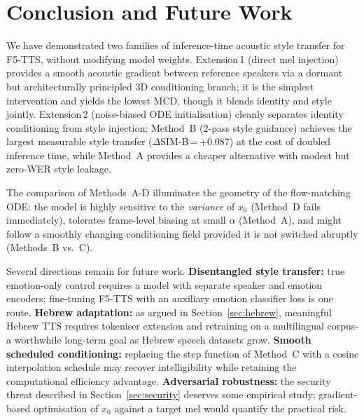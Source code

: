 \documentclass[11pt,a4paper,twocolumn]{article}
\begin{document}
\section{Conclusion and Future Work}
\label{sec:conclusion}

We have demonstrated two families of inference-time acoustic style transfer
for F5-TTS, without modifying model weights.
Extension\,1 (direct mel injection) provides a smooth acoustic gradient
between reference speakers via a dormant but architecturally principled 3D
conditioning branch; it is the simplest intervention and yields the lowest
MCD, though it blends identity and style jointly.
Extension\,2 (noise-biased ODE initialisation) cleanly separates identity
conditioning from style injection; Method~B (2-pass style guidance) achieves
the largest measurable style transfer ($\Delta$SIM-B\,=\,+0.087) at the cost
of doubled inference time, while Method~A provides a cheaper alternative with
modest but zero-WER style leakage.

The comparison of Methods~A-D illuminates the geometry of the flow-matching
ODE: the model is highly sensitive to the \emph{variance} of $x_0$ (Method~D
fails immediately), tolerates frame-level biasing at small $\alpha$ (Method~A),
and might follow a smoothly changing conditioning field provided it is not
switched abruptly (Methods~B vs.\ C).

Several directions remain for future work.
\textbf{Disentangled style transfer:} true emotion-only control requires a
model with separate speaker and emotion encoders; fine-tuning F5-TTS with an
auxiliary emotion classifier loss is one route.
\textbf{Hebrew adaptation:} as argued in Section~\ref{sec:hebrew},
meaningful Hebrew TTS requires tokeniser extension and retraining on a
multilingual corpus-a worthwhile long-term goal as Hebrew speech datasets
grow.
\textbf{Smooth scheduled conditioning:} replacing the step function of
Method~C with a cosine interpolation schedule may recover intelligibility
while retaining the computational efficiency advantage.
\textbf{Adversarial robustness:} the security threat described in
Section~\ref{sec:security} deserves some empirical study; gradient-based
optimisation of $x_0$ against a target mel would quantify the practical risk.

\end{document}
